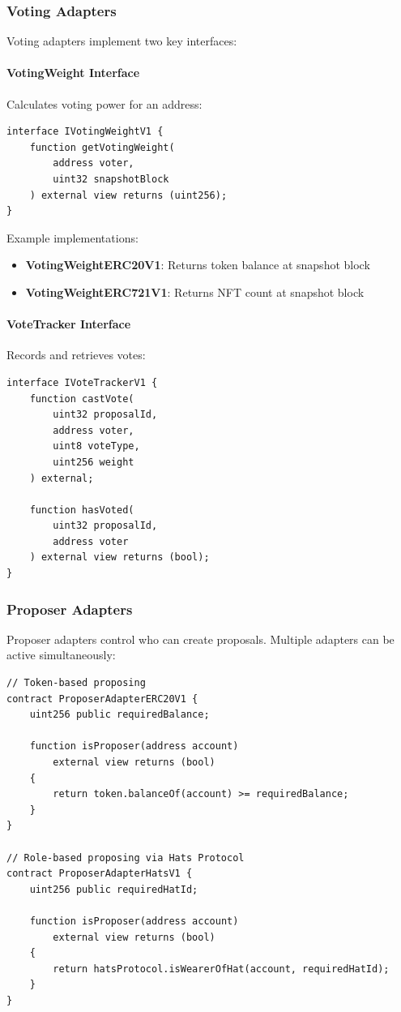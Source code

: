 \documentclass[11pt,a4paper]{article}
\begin{document}
\subsubsection{Voting Adapters}

Voting adapters implement two key interfaces:

\paragraph{VotingWeight Interface} Calculates voting power for an address:

\begin{lstlisting}[caption=VotingWeight Interface]
interface IVotingWeightV1 {
    function getVotingWeight(
        address voter,
        uint32 snapshotBlock
    ) external view returns (uint256);
}
\end{lstlisting}

Example implementations:
\begin{itemize}
    \item \textbf{VotingWeightERC20V1}: Returns token balance at snapshot block
    \item \textbf{VotingWeightERC721V1}: Returns NFT count at snapshot block
\end{itemize}

\paragraph{VoteTracker Interface} Records and retrieves votes:

\begin{lstlisting}[caption=VoteTracker Interface]
interface IVoteTrackerV1 {
    function castVote(
        uint32 proposalId,
        address voter,
        uint8 voteType,
        uint256 weight
    ) external;

    function hasVoted(
        uint32 proposalId,
        address voter
    ) external view returns (bool);
}
\end{lstlisting}

\subsubsection{Proposer Adapters}

Proposer adapters control who can create proposals. Multiple adapters can be active simultaneously:

\begin{lstlisting}[caption=Proposer Adapter Examples]
// Token-based proposing
contract ProposerAdapterERC20V1 {
    uint256 public requiredBalance;

    function isProposer(address account)
        external view returns (bool)
    {
        return token.balanceOf(account) >= requiredBalance;
    }
}

// Role-based proposing via Hats Protocol
contract ProposerAdapterHatsV1 {
    uint256 public requiredHatId;

    function isProposer(address account)
        external view returns (bool)
    {
        return hatsProtocol.isWearerOfHat(account, requiredHatId);
    }
}
\end{lstlisting}
\end{document}
